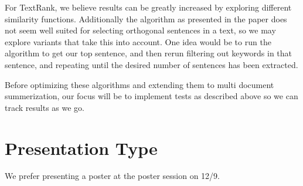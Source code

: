 \documentclass[10pt]{article}
\begin{document}
For TextRank, we believe results can be greatly increased by exploring different similarity functions. Additionally the algorithm as presented in the paper does not seem well suited for selecting orthogonal sentences in a text, so we may explore variants that take this into account. One idea would be to run the algorithm to get our top sentence, and then rerun filtering out keywords in that sentence, and repeating until the desired number of sentences has been extracted.

Before optimizing these algorithms and extending them to multi document summerization, our focus will be to implement tests as described above so we can track results as we go.

\section{Presentation Type}
We prefer presenting a poster at the poster session on 12/9.



\end{document}
